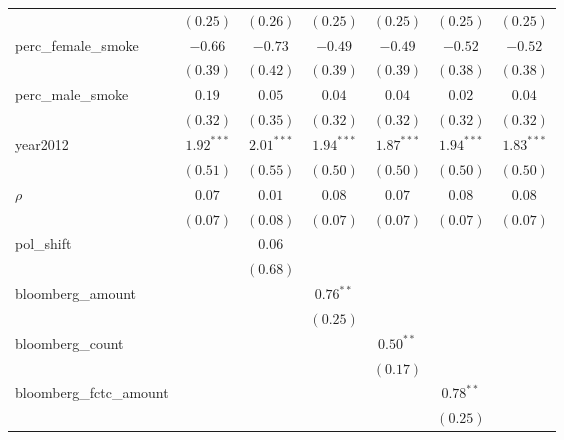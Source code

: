 \begin{table}[!h]
\begin{center}
\begin{tabular}{l c c c c c c }
                        & $(0.25)$     & $(0.26)$     & $(0.25)$     & $(0.25)$     & $(0.25)$     & $(0.25)$     \\
perc\_female\_smoke     & $-0.66$      & $-0.73$      & $-0.49$      & $-0.49$      & $-0.52$      & $-0.52$      \\
                        & $(0.39)$     & $(0.42)$     & $(0.39)$     & $(0.39)$     & $(0.38)$     & $(0.38)$     \\
perc\_male\_smoke       & $0.19$       & $0.05$       & $0.04$       & $0.04$       & $0.02$       & $0.04$       \\
                        & $(0.32)$     & $(0.35)$     & $(0.32)$     & $(0.32)$     & $(0.32)$     & $(0.32)$     \\
year2012                & $1.92^{***}$ & $2.01^{***}$ & $1.94^{***}$ & $1.87^{***}$ & $1.94^{***}$ & $1.83^{***}$ \\
                        & $(0.51)$     & $(0.55)$     & $(0.50)$     & $(0.50)$     & $(0.50)$     & $(0.50)$     \\
$\rho$                  & $0.07$       & $0.01$       & $0.08$       & $0.07$       & $0.08$       & $0.08$       \\
                        & $(0.07)$     & $(0.08)$     & $(0.07)$     & $(0.07)$     & $(0.07)$     & $(0.07)$     \\
pol\_shift              &              & $0.06$       &              &              &              &              \\
                        &              & $(0.68)$     &              &              &              &              \\
bloomberg\_amount       &              &              & $0.76^{**}$  &              &              &              \\
                        &              &              & $(0.25)$     &              &              &              \\
bloomberg\_count        &              &              &              & $0.50^{**}$  &              &              \\
                        &              &              &              & $(0.17)$     &              &              \\
bloomberg\_fctc\_amount &              &              &              &              & $0.78^{**}$  &              \\
                        &              &              &              &              & $(0.25)$     &              \\

\end{tabular}
\end{center}
\end{table}
